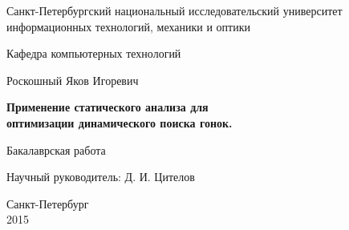 \documentclass{report}
\theoremstyle{plain}
\theoremstyle{definition}
\numberwithin{theorem}{chapter}        %
\begin{document}

\initializefrontsections

\pagestyle{title}

\begin{center}
Санкт-Петербургский национальный исследовательский университет \\ информационных технологий, механики и оптики

\vspace{2cm}

Кафедра компьютерных технологий

\vspace{3cm}

{\Large  Роскошный Яков Игоревич}

\vspace{2cm}

\vbox{\LARGE\bfseries
Применение статического анализа для \\ оптимизации динамического поиска гонок.}

\vspace{4cm}

Бакалаврская работа 

\vspace{1cm}

{\Large Научный руководитель: Д. И. Цителов}

\vspace{5cm}

Санкт-Петербург\\ 2015
\end{center}

\newpage

\setcounter{page}{2}
\pagestyle{plain}



\tableofcontents


\def\t#1{\mbox{\texttt{\hbox{#1}}}}
\def\b#1{\textbf{#1}}
\def\tb#1{\t{\b{#1}}}

\def\cln#1{\t{#1}}
\def\pcn#1{\t{#1}}
\newcommand{\p}{\par Здесь будет текст...}
\def\putImgx#1#2{
  \texttt{[image: img/\#2]}
}

\def\putImg#1{
  \texttt{[image: img/\#1]}
}

\def\drawfigure#1#2{
        \begin{figure}
        \putImg{#1}
        \caption{#2}
        \label{#1}
        \end{figure}
}
\def\drawfigurex#1#2#3#4{
        \begin{figure}[ht]
          \begin{center}
            \putImgx{#4}{#1}
            \caption{#2}
            \label{#3}
          \end{center}
        \end{figure}
}

\startthechapters






%



\end{document}
